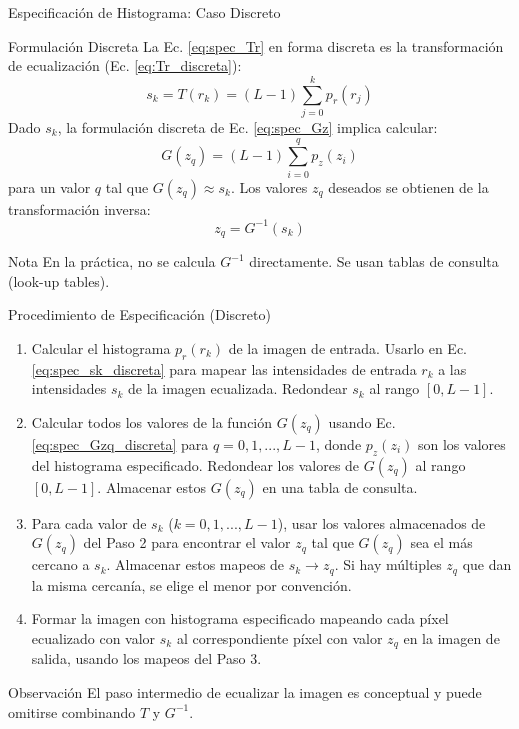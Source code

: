\documentclass{beamer}
\begin{document}
\begin{frame}{Especificación de Histograma: Caso Discreto}\footnotesize
 \begin{block}{Formulación Discreta}
  La Ec. \eqref{eq:spec_Tr} en forma discreta es la transformación de ecualización (Ec. \eqref{eq:Tr_discreta}):
  \begin{equation}
   s_k = T(r_k) = (L-1) \sum_{j=0}^{k} p_r(r_j) \label{eq:spec_sk_discreta}
  \end{equation}
  \pause
  Dado $s_k$, la formulación discreta de Ec. \eqref{eq:spec_Gz} implica calcular:
  \begin{equation}
   G(z_q) = (L-1) \sum_{i=0}^{q} p_z(z_i) \label{eq:spec_Gzq_discreta}
  \end{equation}
  para un valor $q$ tal que $G(z_q) \approx s_k$. \pause Los valores $z_q$ deseados se obtienen de la transformación inversa:
  \begin{equation}
   z_q = G^{-1}(s_k) \label{eq:spec_zq_inversa}
  \end{equation}
 \end{block}
 \begin{exampleblock}{Nota}
  En la práctica, no se calcula $G^{-1}$ directamente. Se usan tablas de consulta (look-up tables).
 \end{exampleblock}
\end{frame}

\begin{frame}{Procedimiento de Especificación (Discreto)}
 \footnotesize %
 \begin{enumerate}
  \item Calcular el histograma $p_r(r_k)$ de la imagen de entrada. Usarlo en Ec. \eqref{eq:spec_sk_discreta} para mapear las intensidades de entrada $r_k$ a las intensidades $s_k$ de la imagen ecualizada. Redondear $s_k$ al rango $[0, L-1]$.
  \item Calcular todos los valores de la función $G(z_q)$ usando Ec. \eqref{eq:spec_Gzq_discreta} para $q=0,1,...,L-1$, donde $p_z(z_i)$ son los valores del histograma especificado. Redondear los valores de $G(z_q)$ al rango $[0, L-1]$. Almacenar estos $G(z_q)$ en una tabla de consulta.
  \item Para cada valor de $s_k$ ($k=0,1,...,L-1$), usar los valores almacenados de $G(z_q)$ del Paso 2 para encontrar el valor $z_q$ tal que $G(z_q)$ sea el más cercano a $s_k$. Almacenar estos mapeos de $s_k \rightarrow z_q$. Si hay múltiples $z_q$ que dan la misma cercanía, se elige el menor por convención.
  \item Formar la imagen con histograma especificado mapeando cada píxel ecualizado con valor $s_k$ al correspondiente píxel con valor $z_q$ en la imagen de salida, usando los mapeos del Paso 3.
 \end{enumerate}
 \begin{block}{Observación}
  El paso intermedio de ecualizar la imagen es conceptual y puede omitirse combinando $T$ y $G^{-1}$.
 \end{block}
\end{frame}
\end{document}
